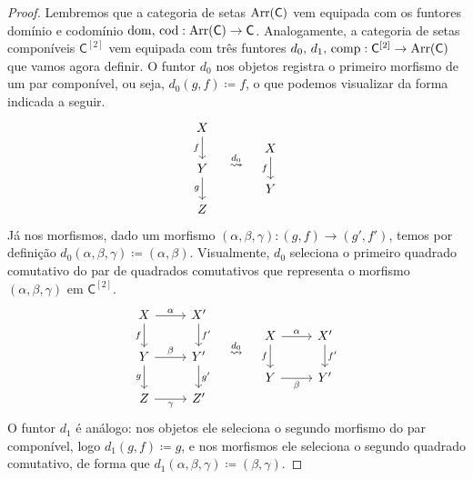 \begin{proof}
  Lembremos que a categoria de setas $\mathrm{Arr}(\mathsf{C})$ vem equipada com os funtores domínio e codomínio $\mathrm{dom},\, \mathrm{cod}: \mathrm{Arr}(\mathsf{C}) \to \mathsf{C}$.
  Analogamente, a categoria de setas componíveis $\mathsf{C}^{[2]}$ vem equipada com três funtores $d_{0},\, d_{1},\, \mathrm{comp}: \mathsf{C}^{[2]} \to \mathrm{Arr}(\mathsf{C})$ que vamos agora definir.
  O funtor $d_{0}$ nos objetos registra o primeiro morfismo de um par componível, ou seja, $d_{0}(g,f) \coloneqq f$, o que podemos visualizar da forma indicada a seguir.
  \begin{displaymath}
    \begin{tikzcd}
      X
      \arrow[d, "f" swap]
      \\ Y
      \arrow[d, "g" swap]
      \\ Z
    \end{tikzcd}
    \quad
    \overset{d_{0}}{\rightsquigarrow}
    \quad
    \begin{tikzcd}
      X
      \arrow[d, "f" swap]
      \\ Y
    \end{tikzcd}
  \end{displaymath}
  Já nos morfismos, dado um morfismo $(\alpha,\beta,\gamma): (g,f) \to (g',f')$, temos por definição $d_{0}(\alpha,\beta,\gamma) \coloneqq (\alpha,\beta)$.
  Visualmente, $d_{0}$ seleciona o primeiro quadrado comutativo do par de quadrados comutativos que representa o morfismo $(\alpha,\beta,\gamma)$ em $\mathsf{C}^{[2]}$.
  \begin{displaymath}
    \begin{tikzcd}
      X
      \arrow[d, "f" swap]
      \arrow[r, "\alpha"]
      & X'
      \arrow[d, "f'"]
      \\ Y
      \arrow[d, "g" swap]
      \arrow[r, "\beta"]
      & Y'
      \arrow[d, "g'"]
      \\ Z
      \arrow[r, "\gamma" swap]
      & Z'
    \end{tikzcd}
    \quad \overset{d_{0}}{\rightsquigarrow} \quad
    \begin{tikzcd}
      X
      \arrow[d, "f" swap]
      \arrow[r, "\alpha"]
      & X'
      \arrow[d, "f'"]
      \\ Y
      \arrow[r, "\beta" swap]
      & Y'
    \end{tikzcd}
  \end{displaymath}
  O funtor $d_{1}$ é análogo: nos objetos ele seleciona o segundo morfismo do par componível, logo $d_{1}(g,f) \coloneqq g$, e nos morfismos ele seleciona o segundo quadrado comutativo, de forma que $d_{1}(\alpha,\beta,\gamma) \coloneqq (\beta,\gamma)$.

\end{proof}

